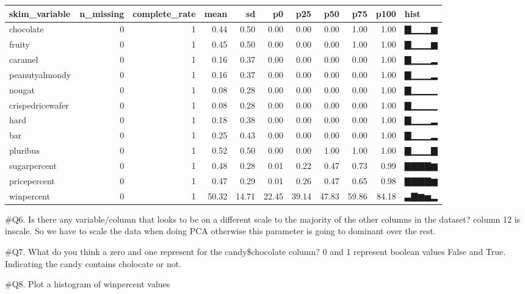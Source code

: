 \documentclass[
]{article}
\newenvironment{Shaded}{\begin{snugshade}}{\end{snugshade}}
\newcommand{\DataTypeTok}[1]{\textcolor[rgb]{0.13,0.29,0.53}{#1}}
\newcommand{\KeywordTok}[1]{\textcolor[rgb]{0.13,0.29,0.53}{\textbf{#1}}}
\newcommand{\NormalTok}[1]{#1}
\newcommand{\OperatorTok}[1]{\textcolor[rgb]{0.81,0.36,0.00}{\textbf{#1}}}
\newcommand{\StringTok}[1]{\textcolor[rgb]{0.31,0.60,0.02}{#1}}
\begin{document}
\begin{longtable}[]{@{}lrrrrrrrrrl@{}}
\toprule
skim\_variable & n\_missing & complete\_rate & mean & sd & p0 & p25 &
p50 & p75 & p100 & hist\tabularnewline
\midrule
\endhead
chocolate & 0 & 1 & 0.44 & 0.50 & 0.00 & 0.00 & 0.00 & 1.00 & 1.00 &
▇▁▁▁▆\tabularnewline
fruity & 0 & 1 & 0.45 & 0.50 & 0.00 & 0.00 & 0.00 & 1.00 & 1.00 &
▇▁▁▁▆\tabularnewline
caramel & 0 & 1 & 0.16 & 0.37 & 0.00 & 0.00 & 0.00 & 0.00 & 1.00 &
▇▁▁▁▂\tabularnewline
peanutyalmondy & 0 & 1 & 0.16 & 0.37 & 0.00 & 0.00 & 0.00 & 0.00 & 1.00
& ▇▁▁▁▂\tabularnewline
nougat & 0 & 1 & 0.08 & 0.28 & 0.00 & 0.00 & 0.00 & 0.00 & 1.00 &
▇▁▁▁▁\tabularnewline
crispedricewafer & 0 & 1 & 0.08 & 0.28 & 0.00 & 0.00 & 0.00 & 0.00 &
1.00 & ▇▁▁▁▁\tabularnewline
hard & 0 & 1 & 0.18 & 0.38 & 0.00 & 0.00 & 0.00 & 0.00 & 1.00 &
▇▁▁▁▂\tabularnewline
bar & 0 & 1 & 0.25 & 0.43 & 0.00 & 0.00 & 0.00 & 0.00 & 1.00 &
▇▁▁▁▂\tabularnewline
pluribus & 0 & 1 & 0.52 & 0.50 & 0.00 & 0.00 & 1.00 & 1.00 & 1.00 &
▇▁▁▁▇\tabularnewline
sugarpercent & 0 & 1 & 0.48 & 0.28 & 0.01 & 0.22 & 0.47 & 0.73 & 0.99 &
▇▇▇▇▆\tabularnewline
pricepercent & 0 & 1 & 0.47 & 0.29 & 0.01 & 0.26 & 0.47 & 0.65 & 0.98 &
▇▇▇▇▆\tabularnewline
winpercent & 0 & 1 & 50.32 & 14.71 & 22.45 & 39.14 & 47.83 & 59.86 &
84.18 & ▃▇▆▅▂\tabularnewline
\bottomrule
\end{longtable}

\#Q6. Is there any variable/column that looks to be on a different scale
to the majority of the other columns in the dataset? column 12 is
inscale. So we have to scale the data when doing PCA otherwise this
parameter is going to dominant over the rest.

\#Q7. What do you think a zero and one represent for the
candy\$chocolate column? 0 and 1 represent boolean values False and
True. Indicating the candy contains cholocate or not.

\#Q8. Plot a histogram of winpercent values

\begin{Shaded}
\end{Shaded}
\end{document}
